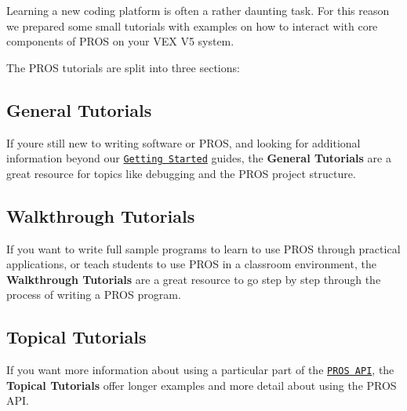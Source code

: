 Learning a new coding platform is often a rather daunting task. For this reason we prepared some small tutorials with examples on how to interact with core components of P\+R\+OS on your V\+EX V5 system.

The P\+R\+OS tutorials are split into three sections\+:

\subsection*{General Tutorials}

If you\textquotesingle{}re still new to writing software or P\+R\+OS, and looking for additional information beyond our \href{../getting-started/index.html}{\tt Getting Started} guides, the {\bfseries General Tutorials} are a great resource for topics like debugging and the P\+R\+OS project structure.

\subsection*{Walkthrough Tutorials}

If you want to write full sample programs to learn to use P\+R\+OS through practical applications, or teach students to use P\+R\+OS in a classroom environment, the {\bfseries Walkthrough Tutorials} are a great resource to go step by step through the process of writing a P\+R\+OS program.

\subsection*{Topical Tutorials}

If you want more information about using a particular part of the \href{../api/index.html}{\tt P\+R\+OS A\+PI}, the {\bfseries Topical Tutorials} offer longer examples and more detail about using the P\+R\+OS A\+PI. 